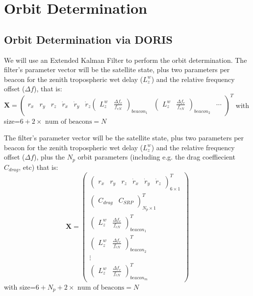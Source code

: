 \chapter{Orbit Determination}
\label{ch:orbit-determination}

\section{Orbit Determination via DORIS}
\label{sec:pod}

We will use an Extended Kalman Filter to perform the orbit determination. The 
filter's parameter vector will be the satellite state, plus two parameters per 
beacon for the zenith tropospheric wet delay ($L^w_z$) and the relative frequency 
offset ($\Delta f$), that is:
$\bm{X}=
    \begin{pmatrix}
        r_x & r_y & r_z & \dot{r}_x & \dot{r}_y & \dot{r}_z 
        \begin{pmatrix} L^w_z & \frac{\Delta f_e}{f_{eN}} \end{pmatrix}_{beacon_1} & 
        \begin{pmatrix} L^w_z & \frac{\Delta f_e}{f_{eN}} \end{pmatrix}_{beacon_2} &
        \cdots 
    \end{pmatrix}^T$
with size=$6+2 \times \text{ num of beacons} = N$

The filter's parameter vector will be the satellite state, plus two parameters per 
beacon for the zenith tropospheric wet delay ($L^w_z$) and the relative frequency 
offset ($\Delta f$), plus the $N_p$ orbit parameters (including e.g. the drag 
coeffiecient $C_{drag}$, etc) that is:
\begin{equation}
\bm{X}=
    \begin{pmatrix}
        \begin{pmatrix} r_x & r_y & r_z & \dot{r}_x & \dot{r}_y & \dot{r}_z \end{pmatrix}^T_{6 \times 1} \\
        \begin{pmatrix} C_{drag} & C_{SRP} \end{pmatrix}^T_{N_p \times 1} \\
        \begin{pmatrix} L^w_z & \frac{\Delta f_e}{f_{eN}} \end{pmatrix}^T_{beacon_1} \\
        \begin{pmatrix} L^w_z & \frac{\Delta f_e}{f_{eN}} \end{pmatrix}^T_{beacon_2} \\
        \vdots \\
        \begin{pmatrix} L^w_z & \frac{\Delta f_e}{f_{eN}} \end{pmatrix}^T_{beacon_m}
    \end{pmatrix}
  \end{equation}
with size=$6 + N_p + 2 \times \text{ num of beacons} = N$

